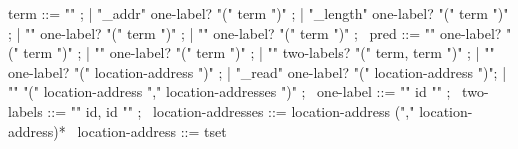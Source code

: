 \begin{syntax}
  term ::= "\null" ;
        | "\base_addr" { one-label? } "(" term ")" ;
        | "\block_length" { one-label? } "(" term ")" ;
        | "\offset" { one-label? }  "(" term ")" ;
        | { "\allocation" one-label? }  "(" term ")" ;
       \
  pred ::=  { "\allocable" one-label? }"(" term ")" ;
       |  { "\freeable" one-label? }"(" term ")" ;
       | "\fresh"  { two-labels? }"(" term, term ")" ;
       | "\valid" { one-label? } "(" location-address ")" ;
       | "\valid_read" { one-label?} "(" location-address ")";
       | "\separated" "(" location-address "," location-addresses ")" ;
       \
  one-label ::= "{" id "}" ;
       \
  two-labels ::= "{" id, id "}" ;
       \
  location-addresses ::= location-address ("," location-address)*
  \
  location-address ::= tset
\end{syntax}

